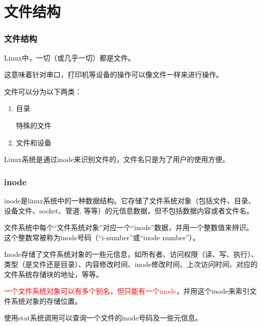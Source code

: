 \documentclass{beamer}
\begin{document}
\section{文件结构} %
\begin{frame}
\frametitle{文件结构}
Linux中，一切（或几乎一切）都是文件。

这意味着针对串口，打印机等设备的操作可以像文件一样来进行操作。

文件可以分为以下两类：
\begin{enumerate}
\item
目录

特殊的文件
\item
文件和设备
\end{enumerate}
Linux系统是通过inode来识别文件的，文件名只是为了用户的使用方便。
\end{frame}
\begin{frame}
\frametitle{inode}
inode是linux系统中的一种数据结构。它存储了文件系统对象（包括文件、目录、设备文件、socket、管道, 等等）的元信息数据，但不包括数据内容或者文件名。


文件系统中每个“文件系统对象”对应一个“inode”数据，并用一个整数值来辨识。这个整数常被称为inode号码（“i-number”或“inode number”）。

Inode存储了文件系统对象的一些元信息，如所有者、访问权限（读、写、执行）、类型（是文件还是目录）、内容修改时间、inode修改时间、上次访问时间、对应的文件系统存储块的地址，等等。

\textcolor{red}{一个文件系统对象可以有多个别名，但只能有一个inode}，并用这个inode来索引文件系统对象的存储位置。

使用stat系统调用可以查询一个文件的inode号码及一些元信息。
\end{frame}
\end{document}
